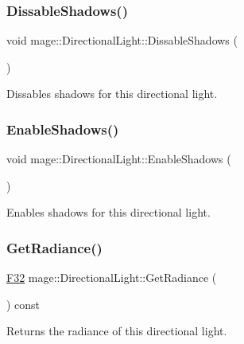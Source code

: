 \subsubsection{\texorpdfstring{Dissable\+Shadows()}{DissableShadows()}}
{\footnotesize\ttfamily void mage\+::\+Directional\+Light\+::\+Dissable\+Shadows (\begin{DoxyParamCaption}{ }\end{DoxyParamCaption})\hspace{0.3cm}{\ttfamily [noexcept]}}

Dissables shadows for this directional light. \hypertarget{classmage_1_1_directional_light_a36436d5d99ccf6a0e49e81f26c3f9bc7}{}\label{classmage_1_1_directional_light_a36436d5d99ccf6a0e49e81f26c3f9bc7} 
\subsubsection{\texorpdfstring{Enable\+Shadows()}{EnableShadows()}}
{\footnotesize\ttfamily void mage\+::\+Directional\+Light\+::\+Enable\+Shadows (\begin{DoxyParamCaption}{ }\end{DoxyParamCaption})\hspace{0.3cm}{\ttfamily [noexcept]}}

Enables shadows for this directional light. \hypertarget{classmage_1_1_directional_light_a73fe73ce8184bf32379ead1e00b34c9f}{}\label{classmage_1_1_directional_light_a73fe73ce8184bf32379ead1e00b34c9f} 
\subsubsection{\texorpdfstring{Get\+Radiance()}{GetRadiance()}}
{\footnotesize\ttfamily \hyperlink{namespacemage_aa97e833b45f06d60a0a9c4fc22ae02c0}{F32} mage\+::\+Directional\+Light\+::\+Get\+Radiance (\begin{DoxyParamCaption}{ }\end{DoxyParamCaption}) const\hspace{0.3cm}{\ttfamily [noexcept]}}

Returns the radiance of this directional light.

